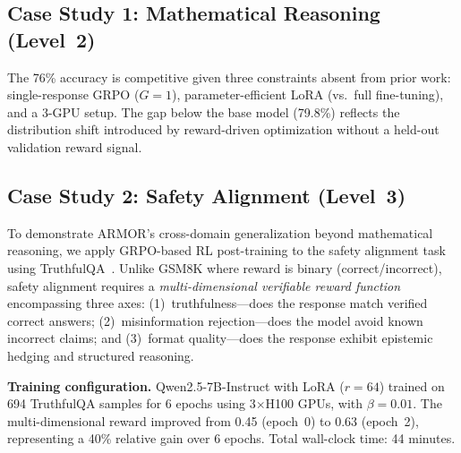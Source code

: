\documentclass{ieeeaccess}
\begin{document}
\subsection{Case Study 1: Mathematical Reasoning (Level~2)}
\begin{table}[t]
\centering
\caption{GSM8K Test Set Accuracy Comparison}
\label{tab:gsm8k_acc}
\end{table}

The 76\% accuracy is competitive given three constraints absent from prior work:
single-response GRPO ($G=1$), parameter-efficient LoRA (vs.\ full fine-tuning),
and a 3-GPU setup.
The gap below the base model (79.8\%) reflects the distribution shift introduced
by reward-driven optimization without a held-out validation reward signal.

\subsection{Case Study 2: Safety Alignment (Level~3)}
\label{sec:safety_grpo}
To demonstrate ARMOR's cross-domain generalization beyond mathematical
reasoning, we apply GRPO-based RL post-training to the safety alignment
task using TruthfulQA~\cite{lin2022truthfulqa}.
Unlike GSM8K where reward is binary (correct/incorrect), safety alignment
requires a \emph{multi-dimensional verifiable reward function} encompassing
three axes: (1)~truthfulness---does the response match verified correct
answers; (2)~misinformation rejection---does the model avoid known
incorrect claims; and (3)~format quality---does the response exhibit
epistemic hedging and structured reasoning.

\textbf{Training configuration.}
Qwen2.5-7B-Instruct with LoRA ($r{=}64$) trained on 694 TruthfulQA
samples for 6 epochs using 3$\times$H100 GPUs, with $\beta{=}0.01$.
The multi-dimensional reward improved from 0.45 (epoch~0) to 0.63
(epoch~2), representing a 40\% relative gain over 6 epochs.
Total wall-clock time: 44 minutes.
\end{document}
